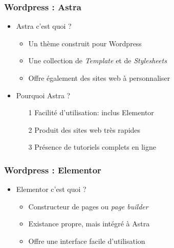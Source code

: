 \documentclass{beamer}
\begin{document}
    \begin{frame}
      \frametitle{Wordpress : Astra}
      \begin{itemize}
        \item<2-> Astra c'est quoi ? 
          \begin{itemize}
            \item Un thème construit pour Wordpress
            \item Une collection de \textit{Template} et de \textit{Stylesheets}
            \item Offre également des sites web à personnaliser 
          \end{itemize}
        \item<3-> Pourquoi Astra ?
          \begin{enumerate}
            \item[1] Facilité d'utilisation: inclus Elementor
            \item[2] Produit des sites web très rapides
            \item[3] Présence de tutoriels complets en ligne
          \end{enumerate}
        \end{itemize}
      \end{frame}
      
      \begin{frame}
        \frametitle{Wordpress : Elementor}
        \begin{itemize}
          \item<2-> Elementor c'est quoi ? 
            \begin{itemize}
              \item Constructeur de pages ou \textit{page builder}
              \item Existance propre, mais intégré à Astra
              \item Offre une interface facile d'utilisation
            \end{itemize}
        \end{itemize}
      \end{frame}
        
\end{document}
